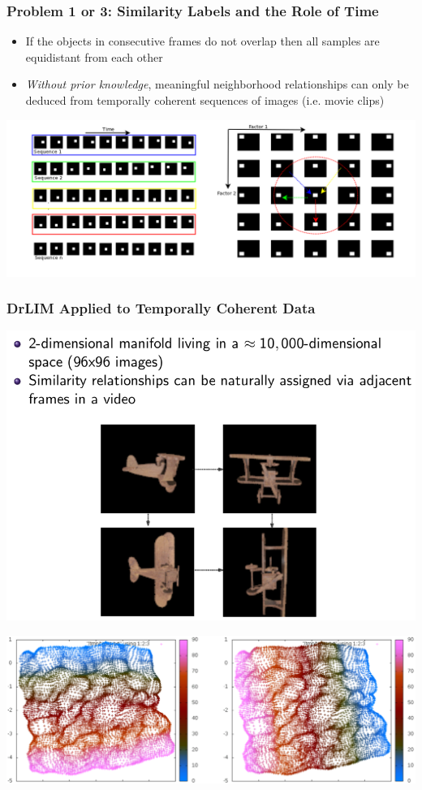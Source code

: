 \documentclass{beamer}
\begin{document}
\begin{frame}
\frametitle{Problem 1 or 3: Similarity Labels and the Role of Time}
\center
\begin{itemize}
\item{If the objects in consecutive frames do not overlap then all samples are equidistant from each other}
\item{\emph{Without prior knowledge}, meaningful neighborhood relationships can only be deduced from temporally coherent sequences of images (i.e. movie clips)}
\end{itemize}
\includegraphics[scale = 0.25]{./figures/diagram1.png} 
\end{frame}

\begin{frame} 
\frametitle{DrLIM Applied to Temporally Coherent Data}
\begin{center} 
\includegraphics[scale = 0.25]{./figures/drlim_data.png} 
\end{center} 
\begin{center} 
\includegraphics[scale = 0.15]{./figures/drlim_result.png} 
\end{center} 
\end{frame} 
\end{document}
